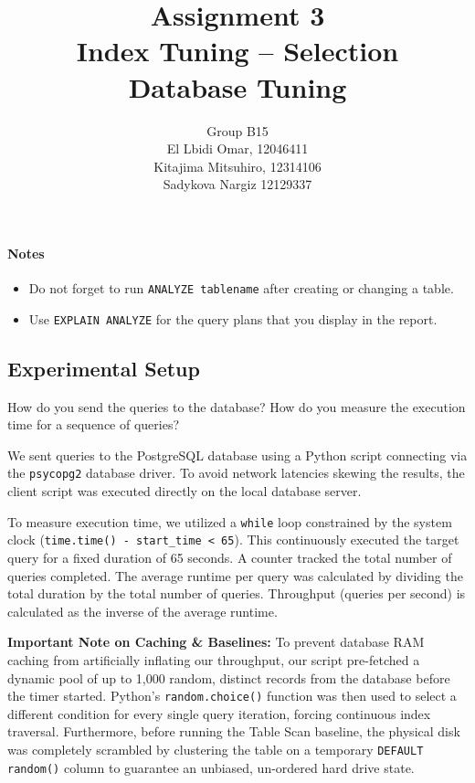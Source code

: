 \documentclass[11pt]{scrartcl}
\title{
  \textbf{\large Assignment 3} \\
  Index Tuning -- Selection \\
  {\large Database Tuning}}
\author{
  Group B15 \\
  \large El Lbidi Omar, 12046411 \\
  \large Kitajima Mitsuhiro, 12314106 \\
  \large Sadykova Nargiz 12129337
}
\begin{document}
\maketitle

\paragraph{Notes}

\begin{itemize}
  \item Do not forget to run \lstinline[style=dbtsql]{ANALYZE tablename} after creating or changing a table.
  \item Use \lstinline[style=dbtsql]{EXPLAIN ANALYZE} for the query plans that you display in the report.
\end{itemize}

\subsection*{Experimental Setup}

How do you send the queries to the database? How do you measure the execution time for a sequence of queries?

We sent queries to the PostgreSQL database using a Python script connecting via the \texttt{psycopg2} database driver. To avoid network latencies skewing the results, the client script was executed directly on the local database server.

To measure execution time, we utilized a \texttt{while} loop constrained by the system clock (\texttt{time.time() - start\_time < 65}). This continuously executed the target query for a fixed duration of 65 seconds. A counter tracked the total number of queries completed. The average runtime per query was calculated by dividing the total duration by the total number of queries. Throughput (queries per second) is calculated as the inverse of the average runtime.

\textbf{Important Note on Caching \& Baselines:} To prevent database RAM caching from artificially inflating our throughput, our script pre-fetched a dynamic pool of up to 1,000 random, distinct records from the database before the timer started. Python's \texttt{random.choice()} function was then used to select a different condition for every single query iteration, forcing continuous index traversal. Furthermore, before running the Table Scan baseline, the physical disk was completely scrambled by clustering the table on a temporary \texttt{DEFAULT random()} column to guarantee an unbiased, un-ordered hard drive state.
\end{document}
